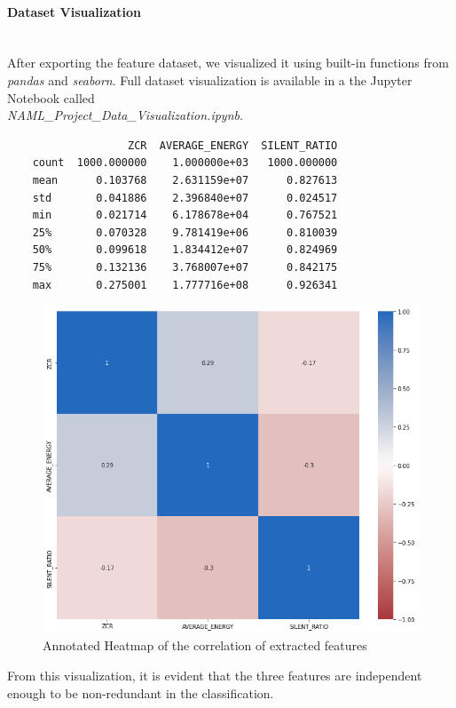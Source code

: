 \documentclass[12pt]{article}
\begin{document}
	\paragraph{Dataset Visualization}\mbox{}\\\newline
	After exporting the feature dataset, we visualized it using built-in functions from \textit{pandas} and \textit{seaborn}. Full dataset visualization is available in a the Jupyter Notebook called\\ \textit{NAML\_Project\_Data\_Visualization.ipynb}.
	
	\begin{lstlisting}
    		       ZCR  AVERAGE_ENERGY  SILENT_RATIO
	count  1000.000000    1.000000e+03   1000.000000
	mean      0.103768    2.631159e+07      0.827613
	std       0.041886    2.396840e+07      0.024517
	min       0.021714    6.178678e+04      0.767521 
	25%       0.070328    9.781419e+06      0.810039
	50%       0.099618    1.834412e+07      0.824969
	75%       0.132136    3.768007e+07      0.842175
	max       0.275001    1.777716e+08      0.926341
	\end{lstlisting}
	
	\begin{figure}[H]
		\hspace{100pt}\includegraphics[scale=0.4]{visual_8_1}
		\caption{Annotated Heatmap of the correlation of extracted features}
	\end{figure}
	From this visualization, it is evident that the three features are independent enough to be non-redundant in the classification. 
	
\end{document}
